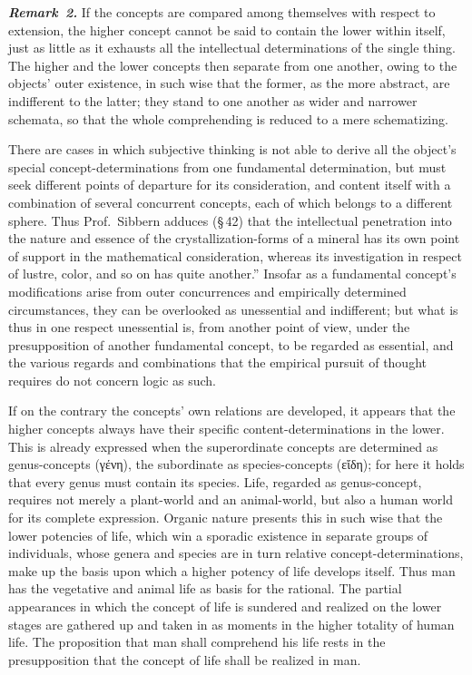 \documentclass[12pt]{book}
\newcommand{\anm}[1]{\emph{\textbf{Remark~#1.}}}
\begin{document}
\anm{2} If the concepts are compared among themselves with respect to
extension, the higher concept cannot be said to contain the lower within
itself, just as little as it exhausts all the intellectual determinations of
the single thing. The higher and the lower concepts then separate from one
another, owing to the objects' outer existence, in such wise that the
former, as the more abstract, are indifferent to the latter; they stand to
one another as wider and narrower schemata, so that the whole comprehending
is reduced to a mere schematizing.

There are cases in which subjective thinking is not able to derive all the
object's special concept-determinations from one fundamental determination,
but must seek different points of departure for its consideration, and
content itself with a combination of several concurrent concepts, each of
which belongs to a different sphere. Thus Prof.\ Sibbern adduces (\S\,42)
that the intellectual penetration into the nature and essence of the
crystallization-forms of a mineral has its own point of support in the
mathematical consideration, whereas its investigation in respect of lustre,
color, and so on has quite another.'' Insofar as a fundamental concept's
modifications arise from outer concurrences and empirically determined
circumstances, they can be overlooked as unessential and indifferent; but
what is thus in one respect unessential is, from another point of view,
under the presupposition of another fundamental concept, to be regarded as
essential, and the various regards and combinations that the empirical
pursuit of thought requires do not concern logic as such.

If on the contrary the concepts' own relations are developed, it appears
that the higher concepts always have their specific content-determinations
in the lower. This is already expressed when the superordinate concepts are
determined as genus-concepts (γένη), the subordinate as species-concepts
(εἴδη); for here it holds that every genus must contain its species. Life,
regarded as genus-concept, requires not merely a plant-world and an
animal-world, but also a human world for its complete expression. Organic
nature presents this in such wise that the lower potencies of life, which
win a sporadic existence in separate groups of individuals, whose genera and
species are in turn relative concept-determinations, make up the basis upon
which a higher potency of life develops itself. Thus man has the vegetative
and animal life as basis for the rational. The partial appearances in which
the concept of life is sundered and realized on the lower stages are
gathered up and taken in as moments in the higher totality of human life.
The proposition that man shall comprehend his life rests in the
presupposition that the concept of life shall be realized in man.
\end{document}
